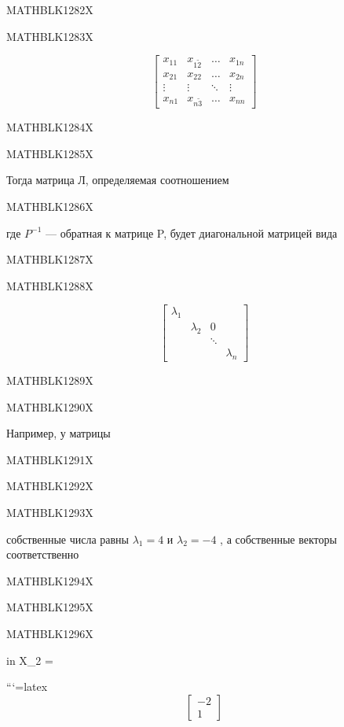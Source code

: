 \documentclass[
]{article}
\begin{document}
MATHBLK1282X

MATHBLK1283X

\[
\begin{bmatrix} x_{11} & x_{1\tilde{2}} & \dots & x_{1n} \\ x_{21} & x_{22} & \dots & x_{2n} \\ \vdots & \vdots & \ddots & \vdots \\ x_{n1} & x_{n\tilde{3}} & \dots & x_{nn} \end{bmatrix}
\]

MATHBLK1284X

MATHBLK1285X

Тогда матрица Л, определяемая соотношением

MATHBLK1286X

где \(P^{-1}\) --- обратная к матрице P, будет диагональной матрицей
вида

MATHBLK1287X

MATHBLK1288X

\[
\begin{bmatrix} \lambda_1 & & & \\ & \lambda_2 & 0 & \\ & & \ddots & \\ & & & \lambda_n \end{bmatrix}
\]

MATHBLK1289X

MATHBLK1290X

Например, у матрицы

MATHBLK1291X

MATHBLK1292X

MATHBLK1293X

собственные числа равны \(\lambda_ 1 = 4\) и \(\lambda_2 = -4\) , а
собственные векторы соответственно

MATHBLK1294X

MATHBLK1295X

MATHBLK1296X

in X\_2 =

```{=latex}
\[
\begin{bmatrix} -2 \\ 1 \end{bmatrix}
\]
\end{document}
